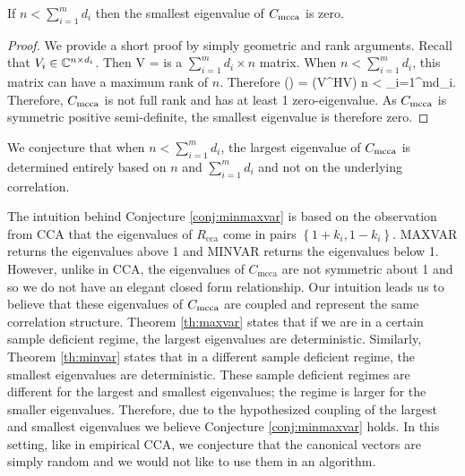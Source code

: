 \begin{Th}\label{th:minvar}
If $n<\sum_{i=1}^md_i$ then the smallest eigenvalue of $C_{\text{mcca}}$ is zero.
\end{Th}
\begin{proof}
  We provide a short proof by simply geometric and rank arguments. Recall that $V_i\in\mathbb{C}^{n\times
    d_i}$. Then
  \be
  V = 
  \ee
  is a $\sum_{i=1}^md_i \times n$ matrix. When $n<\sum_{i=1}^md_i$, this matrix can have a
  maximum rank of $n$. Therefore
  \be
  \rank(\Rmcca) = \rank(V^HV) \leq n < \sum_{i=1}^md_i.
  \ee
  Therefore, $C_{\text{mcca}}$ is not full rank and has at least 1 zero-eigenvalue. As $C_{\text{mcca}}$ is
  symmetric positive semi-definite, the smallest eigenvalue is therefore zero.
\end{proof}

\begin{Conj}\label{conj:minmaxvar}
We conjecture that when $n<\sum_{i=1}^md_i$, the largest eigenvalue of $C_{\text{mcca}}$ is
determined entirely based on $n$ and $\sum_{i=1}^md_i$ and not on the underlying
correlation.
\end{Conj}

The intuition behind Conjecture \ref{conj:minmaxvar} is based on the observation from CCA
that the eigenvalues of $R_{\text{cca}}$ come in pairs
$\left\{1+k_i,1-k_i\right\}$. MAXVAR returns the eigenvalues above 1 and MINVAR returns
the eigenvalues below 1. However, unlike in CCA, the eigenvalues of $C_{\text{mcca}}$ are
not symmetric about 1 and so we do not have an elegant closed form relationship. Our
intuition leads us to believe that these eigenvalues of $C_{\text{mcca}}$ are coupled and represent
the same correlation structure. Theorem \ref{th:maxvar} states that if we are in a certain
sample deficient regime, the largest eigenvalues are deterministic. Similarly, Theorem
\ref{th:minvar} states that in a different sample deficient regime, the smallest
eigenvalues are deterministic. These sample deficient regimes are different for the
largest and smallest eigenvalues; the regime is larger for the smaller
eigenvalues. Therefore, due to the hypothesized coupling of the largest and smallest
eigenvalues we believe Conjecture \ref{conj:minmaxvar} holds. In this setting, like in
empirical CCA, we conjecture that the canonical vectors are simply random and we would not
like to use them in an algorithm.

